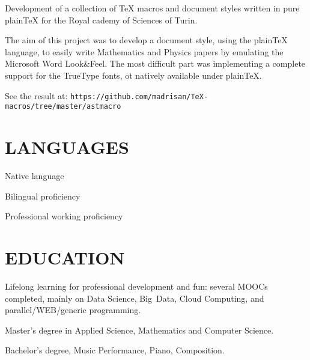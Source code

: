 
\bigskip

\noindent
Development of a collection of TeX macros and document styles written in pure plainTeX
for the Royal cademy of Sciences of Turin.

The aim of this project was to develop a document style, using the plainTeX language, 
to easily write Mathematics and Physics papers by emulating the Microsoft Word 
Look\&Feel.
The most difficult part was implementing a complete support for the TrueType fonts,
ot natively available under plain\TeX.

See the result at:
\hfill\break\noindent
{\tt https:/\negthinspace/github.com/madrisan/TeX-macros/tree/master/astmacro}


\section{LANGUAGES}

Native language

Bilingual proficiency

Professional working proficiency


\section{EDUCATION}

Lifelong learning for professional development and fun:
several MOOCs completed, mainly on Data Science, Big~Data, Cloud Computing,
and parallel/WEB/generic programming.
\bigskip

Master's degree in Applied Science, Mathematics and Computer Science.
\bigskip

Bachelor's degree, Music Performance, Piano, Composition.


